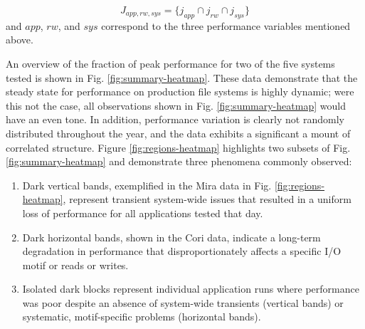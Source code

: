 \begin{equation}
J_{app, rw, sys} = \big\{ j_{app} \cap j_{rw} \cap j_{sys} \big \}
\end{equation}
\noindent
and $app$, $rw$, and $sys$ correspond to the three performance variables mentioned above.

An overview of the fraction of peak performance for two of the five systems tested is shown in Fig. \ref{fig:summary-heatmap}.
These data demonstrate that the steady state for performance on production file systems is highly dynamic; were this not the case, all observations shown in Fig. \ref{fig:summary-heatmap} would have an even tone.
In addition, performance variation is clearly not randomly distributed throughout the year, and the data exhibits a significant a mount of correlated structure.
Figure \ref{fig:regions-heatmap} highlights two subsets of Fig. \ref{fig:summary-heatmap} and demonstrate three phenomena commonly observed:

\begin{enumerate}[leftmargin=*]
\item Dark vertical bands, exemplified in the Mira data in Fig. \ref{fig:regions-heatmap}, represent transient system-wide issues that resulted in a uniform loss of performance for all applications tested that day.
\item Dark horizontal bands, shown in the Cori data, indicate a long-term degradation in performance that disproportionately affects a specific I/O motif or reads or writes.
\item Isolated dark blocks represent individual application runs where performance was poor despite an absence of system-wide transients (vertical bands) or systematic, motif-specific problems (horizontal bands).
\end{enumerate}




